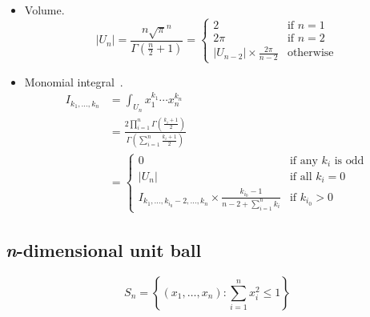 \documentclass[draft]{scrartcl}
\begin{document}
\begin{itemize}
  \item Volume.
\begin{equation}\label{ndimsphere}
  |U_n|
  = \frac{n \sqrt{\pi}^n}{\Gamma(\frac{n}{2}+1)}
  = \begin{cases}
    2&\text{if $n = 1$}\\
    2\pi&\text{if $n = 2$}\\
    |U_{n-2}| \times \frac{2\pi}{n - 2}&\text{otherwise}
  \end{cases}
\end{equation}

  \item Monomial integral~\cite{folland}.
\begin{align}\nonumber
  I_{k_1,\dots,k_n}
  &= \int_{U_n} x_1^{k_1}\cdots x_n^{k_n}\\
  &= \frac{2\prod_{i=1}^n
    \Gamma\left(\frac{k_i+1}{2}\right)}{\Gamma\left(\sum_{i=1}^n\frac{k_i+1}{2}\right)}\label{sphere:closed}\\
  &=\begin{cases}
    0&\text{if any $k_i$ is odd}\\
    |U_n|&\text{if all $k_i=0$}\\
    I_{k_1,\dots,k_{i_0}-2,\dots,k_n} \times \frac{k_{i_0} - 1}{n - 2 + \sum_{i=1}^n k_i}&\text{if $k_{i_0} > 0$}
  \end{cases}
\end{align}
\end{itemize}


\subsection*{\textit{n}-dimensional unit ball}
\[
  S_n = \left\{(x_1,\dots,x_n): \sum_{i=1}^n x_i^2 \le 1\right\}
\]
\end{document}
